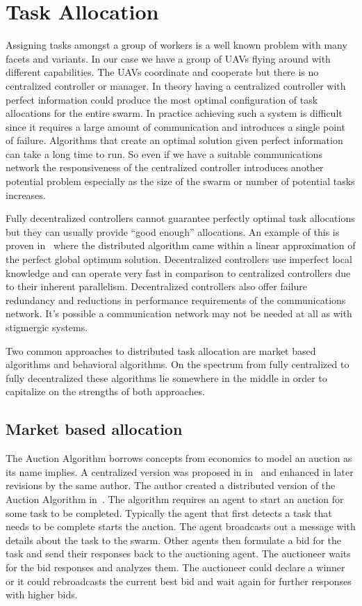 \chapter{Task Allocation}
\label{sec:uncoordTasking}

Assigning tasks amongst a group of workers is a well known problem with many facets and variants.  In our case we have a group of UAVs flying around with different capabilities.  The UAVs coordinate and cooperate but there is no centralized controller or manager.   In theory having a centralized controller with perfect information could produce the most optimal configuration of task allocations for the entire swarm.  In practice achieving such a system is difficult since it requires a large amount of communication and introduces a single point of failure.  Algorithms that create an optimal solution given perfect information can take a long time to run.  So even if we have a suitable communications network the responsiveness of the centralized controller introduces another potential problem especially as the size of the swarm or number of potential tasks increases.

Fully decentralized controllers cannot guarantee perfectly optimal task allocations but they can usually provide ``good enough'' allocations.  An example of this is proven in~\cite{auction_linear_approx} where the distributed algorithm came within a linear approximation of the perfect global optimum solution.  Decentralized controllers use imperfect local knowledge and can operate very fast in comparison to centralized controllers due to their inherent parallelism.  Decentralized controllers also offer failure redundancy and reductions in performance requirements of the communications network.  It's possible a communication network may not be needed at all as with stigmergic systems.

Two common approaches to distributed task allocation are market based algorithms and behavioral algorithms.  On the spectrum from fully centralized to fully decentralized these algorithms lie somewhere in the middle in order to capitalize on the strengths of both approaches.

\section{Market based allocation}

The Auction Algorithm borrows concepts from economics to model an auction as its name implies.  A centralized version was proposed in in~\cite{auction_derive} and enhanced in later revisions by the same author.  The author created a distributed version of the Auction Algorithm in~\cite{auction_parallel}.  The algorithm requires an agent to start an auction for some task to be completed.  Typically the agent that first detects a task that needs to be complete starts the auction.  The agent broadcasts out a message with details about the task to the swarm.  Other agents then formulate a bid for the task and send their responses back to the auctioning agent.  The auctioneer waits for the bid responses and analyzes them.  The auctioneer could declare a winner or it could rebroadcasts the current best bid and wait again for further responses with higher bids.  

